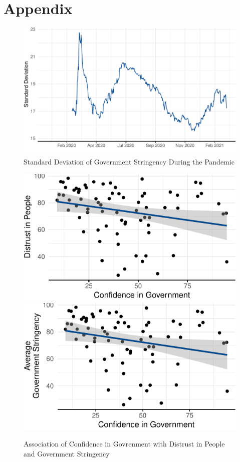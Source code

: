 \documentclass[
  11pt,
]{article}
\begin{document}
\newpage

\hypertarget{appendix}{%
\section*{Appendix}\label{appendix}}

\setcounter{table}{0}  \renewcommand{\thetable}{A\arabic{table}} \setcounter{figure}{0} \renewcommand{\thefigure}{A\arabic{figure}}

\begin{figure}
\includegraphics[width=0.8\linewidth]{write_up_test_files/figure-latex/stringency-sd-1} \caption{Standard Deviation of Government Stringency During the Pandemic}\label{fig:stringency-sd}
\end{figure}

\begin{figure}
\includegraphics[width=0.48\linewidth]{write_up_test_files/figure-latex/conf-plots-1} \includegraphics[width=0.48\linewidth]{write_up_test_files/figure-latex/conf-plots-2} \caption{Association of Confidence in Govrenment with Distrust in People and Government Stringency}\label{fig:conf-plots}
\end{figure}
\end{document}
